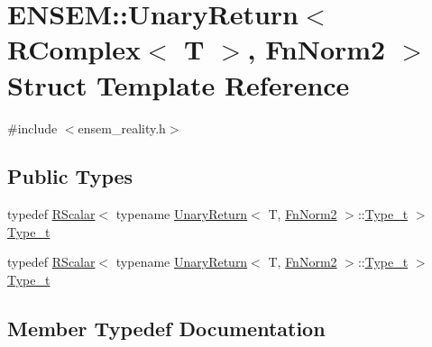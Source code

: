 \hypertarget{structENSEM_1_1UnaryReturn_3_01RComplex_3_01T_01_4_00_01FnNorm2_01_4}{}\section{E\+N\+S\+EM\+:\+:Unary\+Return$<$ R\+Complex$<$ T $>$, Fn\+Norm2 $>$ Struct Template Reference}
\label{structENSEM_1_1UnaryReturn_3_01RComplex_3_01T_01_4_00_01FnNorm2_01_4}


{\ttfamily \#include $<$ensem\+\_\+reality.\+h$>$}

\subsection*{Public Types}
\begin{DoxyCompactItemize}
\item 
typedef \mbox{\hyperlink{classENSEM_1_1RScalar}{R\+Scalar}}$<$ typename \mbox{\hyperlink{structENSEM_1_1UnaryReturn}{Unary\+Return}}$<$ T, \mbox{\hyperlink{structENSEM_1_1FnNorm2}{Fn\+Norm2}} $>$\+::\mbox{\hyperlink{structENSEM_1_1UnaryReturn_3_01RComplex_3_01T_01_4_00_01FnNorm2_01_4_a6b6070508bed1e14a03db04ab901526a}{Type\+\_\+t}} $>$ \mbox{\hyperlink{structENSEM_1_1UnaryReturn_3_01RComplex_3_01T_01_4_00_01FnNorm2_01_4_a6b6070508bed1e14a03db04ab901526a}{Type\+\_\+t}}
\item 
typedef \mbox{\hyperlink{classENSEM_1_1RScalar}{R\+Scalar}}$<$ typename \mbox{\hyperlink{structENSEM_1_1UnaryReturn}{Unary\+Return}}$<$ T, \mbox{\hyperlink{structENSEM_1_1FnNorm2}{Fn\+Norm2}} $>$\+::\mbox{\hyperlink{structENSEM_1_1UnaryReturn_3_01RComplex_3_01T_01_4_00_01FnNorm2_01_4_a6b6070508bed1e14a03db04ab901526a}{Type\+\_\+t}} $>$ \mbox{\hyperlink{structENSEM_1_1UnaryReturn_3_01RComplex_3_01T_01_4_00_01FnNorm2_01_4_a6b6070508bed1e14a03db04ab901526a}{Type\+\_\+t}}
\end{DoxyCompactItemize}


\subsection{Member Typedef Documentation}
\mbox{\label{structENSEM_1_1UnaryReturn_3_01RComplex_3_01T_01_4_00_01FnNorm2_01_4_a6b6070508bed1e14a03db04ab901526a}} 

